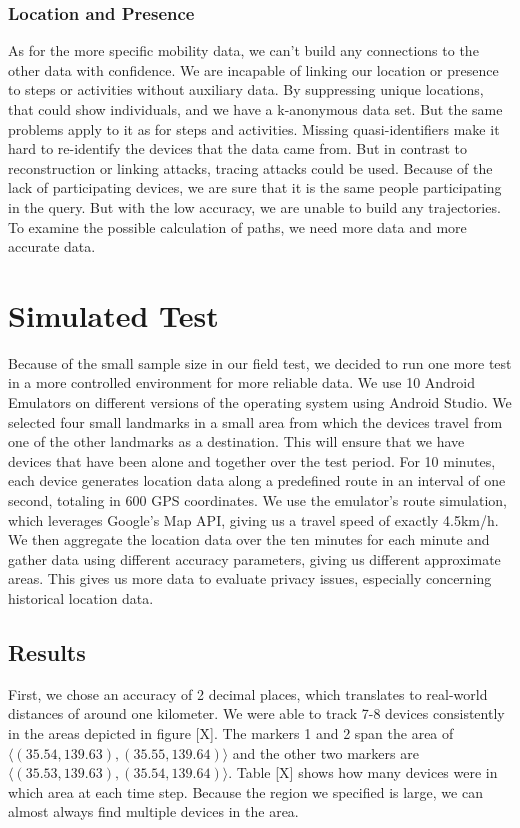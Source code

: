 \subsubsection{Location and Presence}

As for the more specific mobility data, we can't build any connections to the other data with confidence. We are incapable of linking our location or presence to steps or activities without auxiliary data. By suppressing unique locations, that could show individuals, and we have a k-anonymous data set. But the same problems apply to it as for steps and activities. Missing quasi-identifiers make it hard to re-identify the devices that the data came from. 
But in contrast to reconstruction or linking attacks, tracing attacks could be used. Because of the lack of participating devices, we are sure that it is the same people participating in the query. But with the low accuracy, we are unable to build any trajectories. To examine the possible calculation of paths, we need more data and more accurate data.

\section{Simulated Test}
Because of the small sample size in our field test, we decided to run one more test in a more controlled environment for more reliable data. We use 10 Android Emulators on different versions of the operating system using Android Studio. We selected four small landmarks in a small area from which the devices travel from one of the other landmarks as a destination. This will ensure that we have devices that have been alone and together over the test period. For 10 minutes, each device generates location data along a predefined route in an interval of one second, totaling in 600 GPS coordinates. We use the emulator's route simulation, which leverages Google's Map API, giving us a travel speed of exactly 4.5km/h. We then aggregate the location data over the ten minutes for each minute and gather data using different accuracy parameters, giving us different approximate areas. This gives us more data to evaluate privacy issues, especially concerning historical location data.

\subsection{Results}
First, we chose an accuracy of 2 decimal places, which translates to real-world distances of around one kilometer. We were able to track 7-8 devices consistently in the areas depicted in figure [X]. The markers 1 and 2 span the area of \(\langle(35.54, 139.63),(35.55, 139.64)\rangle\) and the other two markers are \(\langle(35.53, 139.63),(35.54, 139.64)\rangle\). Table [X] shows how many devices were in which area at each time step. 
Because the region we specified is large, we can almost always find multiple devices in the area.

